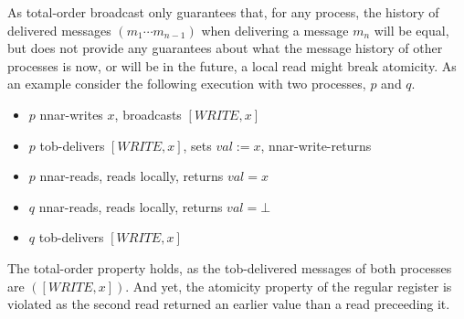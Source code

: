 \documentclass[a4paper]{scrreprt}
\begin{document}
As total-order broadcast only guarantees that, for any process, the history of
delivered messages $(m_1 \cdots m_{n-1})$ when delivering a message $m_n$ will
be equal, but does not provide any guarantees about what the message history of
other processes is now, or will be in the future, a local read might break
atomicity. As an example consider the following execution with two processes,
$p$ and $q$.

\begin{itemize}
	\item $p$ nnar-writes $x$, broadcasts $[WRITE, x]$
	\item $p$ tob-delivers $[WRITE, x]$, sets $val := x$, nnar-write-returns
	\item $p$ nnar-reads, reads locally, returns $val = x$
	\item $q$ nnar-reads, reads locally, returns $val = \bot$
	\item $q$ tob-delivers  $[WRITE, x]$
\end{itemize}

The total-order property holds, as the tob-delivered messages of both processes
are $([WRITE, x])$. And yet, the atomicity property of the regular register is
violated as the second read returned an earlier value than a read preceeding
it.
\end{document}
